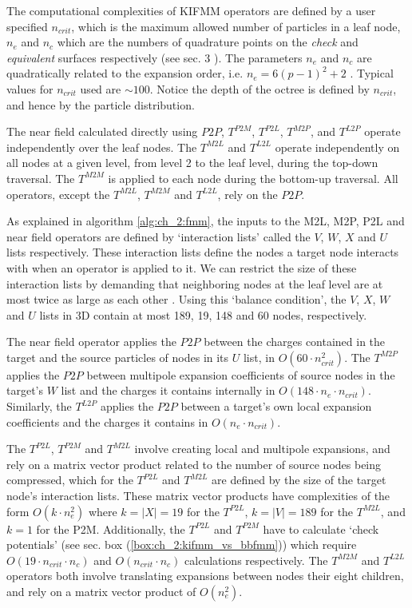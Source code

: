 The computational complexities of KIFMM operators are defined by a user specified $n_{crit}$, which is the maximum allowed number of particles in a leaf node, $n_e$ and $n_c$ which are the numbers of quadrature points on the \textit{check} and \textit{equivalent} surfaces respectively (see sec. 3 \cite{Ying:2004:JCP}). The parameters $n_e$ and $n_c$ are quadratically related to the expansion order, i.e. $n_e = 6(p-1)^2 + 2$ \cite{Ying:2004:JCP}. Typical values for $n_{crit}$ used are $\sim 100$. Notice the depth of the octree is defined by $n_{crit}$, and hence by the particle distribution.

The near field calculated directly using $P2P$, $T^{P2M}$, $T^{P2L}$, $T^{M2P}$, and $T^{L2P}$ operate independently over the leaf nodes. The $T^{M2L}$ and $T^{L2L}$ operate independently on all nodes at a given level, from level 2 to the leaf level, during the top-down traversal. The $T^{M2M}$ is applied to each node during the bottom-up traversal. All operators, except the $T^{M2L}$, $T^{M2M}$ and $T^{L2L}$, rely on the $P2P$. 

As explained in algorithm \ref{alg:ch_2:fmm}, the inputs to the M2L, M2P, P2L and near field operators are defined by `interaction lists' called the $V$, $W$, $X$ and $U$ lists respectively.  These interaction lists define the nodes a target node interacts with when an operator is applied to it. We can restrict the size of these interaction lists by demanding that neighboring nodes at the leaf level are at most twice as large as each other \cite{sundar2008bottom}. Using this `balance condition', the $V$, $X$, $W$ and $U$ lists in 3D contain at most 189, 19, 148 and 60 nodes, respectively.

The near field operator applies the $P2P$ between the charges contained in the target and the source particles of nodes in its $U$ list, in $O(60 \cdot n_{crit}^2)$. The $T^{M2P}$ applies the $P2P$ between multipole expansion coefficients of source nodes in the target's $W$ list and the charges it contains internally in $O(148 \cdot n_e \cdot n_{crit})$. Similarly, the $T^{L2P}$ applies the $P2P$ between a target's own local expansion coefficients and the charges it contains in $O(n_e \cdot n_{crit})$.

The $T^{P2L}$, $T^{P2M}$ and $T^{M2L}$ involve creating local and multipole expansions, and rely on a matrix vector product related to the number of source nodes being compressed, which for the $T^{P2L}$ and $T^{M2L}$ are defined by the size of the target node's interaction lists. These matrix vector products have complexities of the form $O(k \cdot n_e^2)$ where $k = |X| = 19$ for the $T^{P2L}$, $k = |V| = 189$ for the $T^{M2L}$, and $k = 1$ for the P2M. Additionally, the $T^{P2L}$ and $T^{P2M}$ have to calculate `check potentials' (see sec. box (\ref{box:ch_2:kifmm_vs_bbfmm})) which require $O(19 \cdot n_{crit} \cdot n_c)$ and $O(n_{crit} \cdot n_c)$ calculations respectively. The $T^{M2M}$ and $T^{L2L}$ operators both involve translating expansions between nodes their eight children, and rely on a matrix vector product of $O(n_e^2)$.

